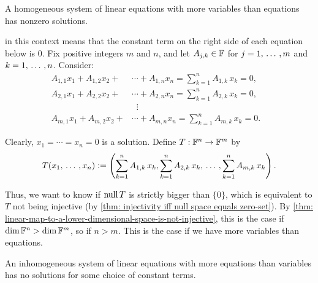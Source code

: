 \begin{thm} 
  A homogeneous system of linear equations with more variables than equations has nonzero solutions.
\end{thm}
\begin{prf}  in this context means that the constant term on the right side of each equation below is $0$. Fix positive integers $m$ and $n$, and let $A_{j,k} \in \mathbb{F}$ for $j = 1, {\, \ldots \,\,}, m$ and $k = 1, {\, \ldots \,\,}, n$. Consider:
\[
\begin{aligned}
  A_{1,1}x_1 + A_{1,2}x_2 + &\cdots + A_{1,n}x_n = \sum_{k=1}^n A_{1,k}\,x_k = 0,\\
  A_{2,1}x_1 + A_{2,2}x_2 + &\cdots + A_{2,n}x_n = \sum_{k=1}^n A_{2,k}\,x_k = 0,\\
  &\; \; \vdots & \\
  A_{m,1}x_1 + A_{m,2}x_2 + &\cdots + A_{m,n}x_n = \sum_{k=1}^n A_{m,k}\,x_k = 0.
\end{aligned}
\]

Clearly, $x_1 = \cdots = x_n = 0$ is a solution. Define $T: \mathbb{F}^n \to \mathbb{F}^m$ by
\begin{equation}
  T(x_1, {\, \ldots \,\,}, x_n) := \left(\sum_{k=1}^n A_{1,k}\,x_k,\sum_{k=1}^n A_{2,k}\,x_k, {\, \ldots \,\,}, \sum_{k=1}^n A_{m,k}\,x_k \right).
\end{equation}

Thus, we want to know if $\operatorname{null} T$ is strictly bigger than $\{0\}$, which is equivalent to $T$ not being injective (by \ref{thm: injectivity iff null space equals zero-set}). By \ref{thm: linear-map-to-a-lower-dimensional-space-is-not-injective}, this is the case if $\dim \mathbb{F}^n > \dim \mathbb{F}^m$, so if $n>m$. This is the case if we have more variables than equations.
\end{prf}

\begin{thm} 
  An inhomogeneous system of linear equations with more equations than variables has no solutions for some choice of constant terms.
\end{thm}

